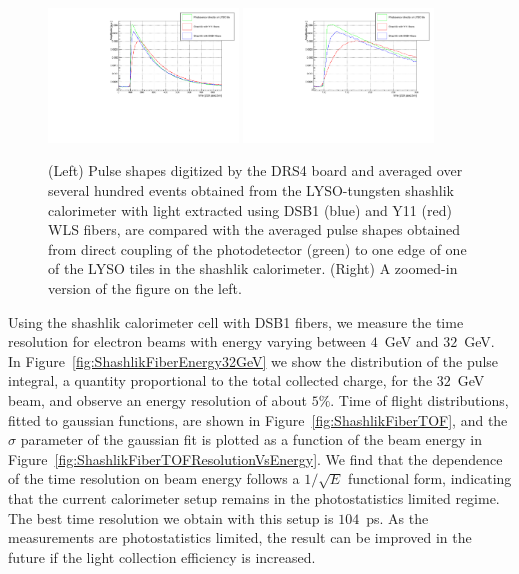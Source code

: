 \documentclass[12pt]{article}
\begin{document}
\begin{figure}[H] \centering
\includegraphics[width=0.45\textwidth]{figs/FiberPulses} 
\includegraphics[width=0.45\textwidth]{figs/FiberPulsesZoom} 
\caption{(Left) Pulse shapes digitized by the DRS4 board and averaged over several hundred events 
obtained from the LYSO-tungsten shashlik calorimeter with light extracted using
DSB1 (blue) and Y11 (red) WLS fibers, are compared with 
the averaged pulse shapes obtained from direct coupling of the photodetector (green)
to one edge of one of the LYSO tiles in the shashlik calorimeter. (Right) A zoomed-in version of the figure on the left.} 
\label{fig:FiberPulseComparison}
\end{figure}


Using the shashlik calorimeter cell with DSB1 fibers, we measure the time resolution
for electron beams with energy varying between $4$~GeV and $32$~GeV.
In Figure~\ref{fig:ShashlikFiberEnergy32GeV} we show the distribution
of the pulse integral, a quantity proportional to the total collected charge,
for the $32$~GeV beam, and observe an energy resolution of about $5\%$.
Time of flight distributions, fitted to gaussian functions,
are shown in Figure~\ref{fig:ShashlikFiberTOF}, and the 
$\sigma$ parameter of the gaussian fit is plotted as a function of the
beam energy in Figure~\ref{fig:ShashlikFiberTOFResolutionVsEnergy}.
We find that the dependence of the time resolution on
beam energy follows a $1/\sqrt{E}$ functional form, indicating
that the current calorimeter setup remains in the photostatistics
limited regime. The best time resolution we obtain
with this setup is $104$~ps. As the measurements are photostatistics
limited, the result can be improved in the future if the light collection
efficiency is increased.
\end{document}
